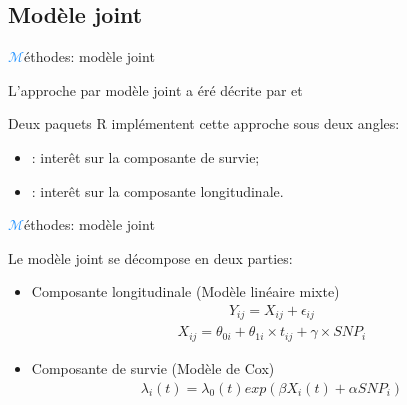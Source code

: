 \subsection{Modèle joint}
\begin{frame}{{\huge\textcolor{dodgerblue}{$\mathcal{M}$}}éthodes: modèle joint}
\par{L'approche par modèle joint a éré décrite par \textcolor{dodgerblue}{\cite{tsiatis2004}} et \textcolor{dodgerblue}{\cite{ibrahim_basic_2010}}
\begin{center}
\end{center}
}
\par{Deux paquets R implémentent cette approche sous deux angles:
\begin{itemize}
\item {} \textcolor{dodgerblue}{\citep{rizopoulos_jm_2010}}: interêt sur la composante de survie;
\item {} \textcolor{dodgerblue}{\citep{philipson_joiner_2012}}: interêt sur la composante longitudinale.
\end{itemize}
}
\end{frame}

\begin{frame}{{\huge\textcolor{dodgerblue}{$\mathcal{M}$}}éthodes: modèle joint}
\par{Le modèle joint se décompose en deux parties:
\begin{itemize}
    \item Composante longitudinale (Modèle linéaire mixte)
        \textcolor{springgreen3}{\begin{eqnarray}
            Y_{ij}=X_{ij}+\epsilon_{ij}\label{eq:1}
        \end{eqnarray}
        \vspace{-3em}
        \begin{eqnarray}
            X_{ij}=\theta_{0i}+\theta_{1i}\times t_{ij}+\gamma \times SNP_i\label{eq:2}
        \end{eqnarray}}
    \item Composante de survie (Modèle de Cox)
        \textcolor{springgreen3}{\begin{eqnarray}\lambda_i(t)=\lambda_0(t) exp(\beta X_i(t)+\alpha SNP_i)\label{eq:3}\end{eqnarray}}
\end{itemize}
}
\end{frame}

